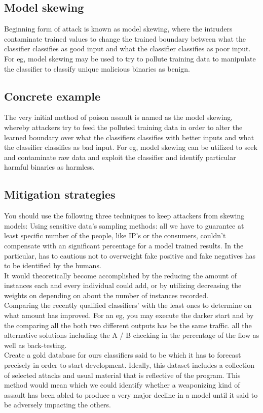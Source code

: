 \documentclass[journal,twoside,web]{ieeecolor}
\begin{document}
\subsection{Model skewing}
Beginning form of attack is known as model skewing, where the intruders contaminate trained values to change the trained boundary between what the classifier classifies as good input and what the classifier classifies as poor input. For eg, model skewing may be used to try to pollute training data to manipulate the classifier to classify unique malicious binaries as benign.

\subsection{Concrete example}
The very initial method of poison assault is named as the model skewing, whereby attackers try to feed the polluted training data in order to alter the learned boundary over what the classifiers classifies with better inputs and what the classifier classifies as bad input. For eg, model skewing can be utilized to seek and contaminate raw data and exploit the classifier and identify particular harmful binaries as harmless.

\subsection{Mitigation strategies}
You should use the following three techniques to keep attackers from skewing models:
Using sensitive data's sampling methods: all we have to guarantee at least specific number of the people, like IP's or the consumers, couldn't compensate with an significant percentage for a model trained results. In the particular, has to cautious not to overweight fake positive and fake negatives has to be identified by the humans.\\
It would theoretically become accomplished by the reducing the amount of instances each and every individual could add, or by utilizing decreasing the weights on depending on about the number of instances recorded.\\
Comparing the recently qualified classifiers' with the least ones to determine on what amount has improved. For an eg, you may execute the darker start and by the comparing all the both two different outputs has be the same traffic. all the alternative solutions including the A / B checking in the percentage of the flow as well as back-testing.\\
Create a gold database for ours classifiers said to be which it has to forecast precisely in order to start development. Ideally, this dataset includes a collection of selected attacks and usual material that is reflective of the program. This method would mean which we could identify whether a weaponizing kind of assault has been abled to produce a very major decline in a model until it said to be adversely impacting the others.
\end{document}
